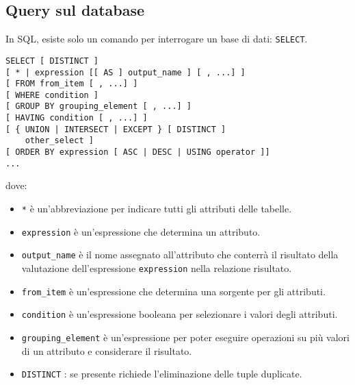 \documentclass[a4paper, 10pt, titlepage]{article}
\begin{document}
	\subsection{Query sul database}
		In SQL, esiste solo un comando per interrogare un base di dati: \lstinline|SELECT|.
		\begin{lstlisting}
SELECT [ DISTINCT ]
[ * | expression [[ AS ] output_name ] [ , ...] ]
[ FROM from_item [ , ...] ]
[ WHERE condition ]
[ GROUP BY grouping_element [ , ...] ]
[ HAVING condition [ , ...] ]
[ { UNION | INTERSECT | EXCEPT } [ DISTINCT ]
	other_select ]
[ ORDER BY expression [ ASC | DESC | USING operator ]]
...
		\end{lstlisting}
		dove:
		\begin{itemize}
			\item \lstinline|*| è un’abbreviazione per indicare tutti gli attributi delle tabelle.
			\item \lstinline|expression| è un’espressione che determina un attributo.
			\item \lstinline|output_name| è il nome assegnato all’attributo che conterrà il risultato
			della valutazione dell’espressione \lstinline|expression| nella relazione risultato.
			\item \lstinline|from_item| è un’espressione che determina una sorgente per gli attributi.
			\item \lstinline|condition| è un’espressione booleana per selezionare i valori degli
			attributi.
			\item \lstinline|grouping_element| è un’espressione per poter eseguire operazioni su
			più valori di un attributo e considerare il risultato.
			\item \lstinline|DISTINCT| : se presente richiede l’eliminazione delle tuple duplicate.
		\end{itemize}
		
\end{document}
